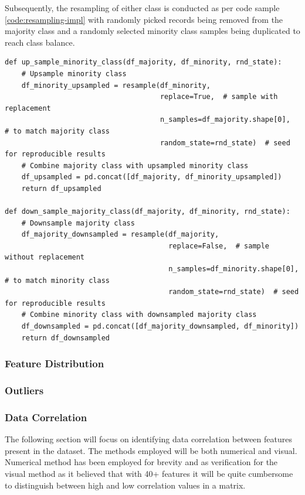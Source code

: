 Subsequently, the resampling of either class is conducted as per code sample \ref{code:resampling-impl} with randomly picked records being removed from the majority class and a randomly selected minority class samples being duplicated to reach class balance. 
\begin{landscape}
\begin{code}
\label{code:resampling-impl}
\begin{verbatim}
def up_sample_minority_class(df_majority, df_minority, rnd_state):
    # Upsample minority class
    df_minority_upsampled = resample(df_minority,
                                     replace=True,  # sample with replacement
                                     n_samples=df_majority.shape[0],  # to match majority class
                                     random_state=rnd_state)  # seed for reproducible results
    # Combine majority class with upsampled minority class
    df_upsampled = pd.concat([df_majority, df_minority_upsampled])
    return df_upsampled

def down_sample_majority_class(df_majority, df_minority, rnd_state):
    # Downsample majority class
    df_majority_downsampled = resample(df_majority,
                                       replace=False,  # sample without replacement
                                       n_samples=df_minority.shape[0],  # to match minority class
                                       random_state=rnd_state)  # seed for reproducible results
    # Combine minority class with downsampled majority class
    df_downsampled = pd.concat([df_majority_downsampled, df_minority])
    return df_downsampled
\end{verbatim}
\end{code}
\end{landscape}

\subsubsection{Feature Distribution}\label{sec:impl-data-analysis:feature-dist}

\subsubsection{Outliers}\label{sec:impl-data-analysis:outliers}

\subsubsection{Data Correlation}\label{sec:impl-data-analysis:corr:generic-approach}
The following section will focus on identifying data correlation between features present in the dataset. The methods employed will be both numerical and visual. Numerical method has been employed for brevity and as verification for the visual method as it believed that with 40+ features it will be quite cumbersome to distinguish between high and low correlation values in a matrix.

